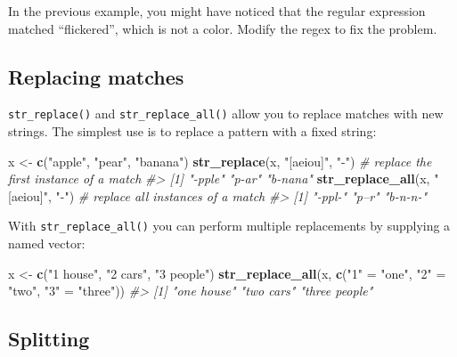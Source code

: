 \documentclass[]{book}
\newenvironment{Shaded}{\begin{snugshade}}{\end{snugshade}}
\newcommand{\CommentTok}[1]{\textcolor[rgb]{0.56,0.35,0.01}{\textit{#1}}}
\newcommand{\KeywordTok}[1]{\textcolor[rgb]{0.13,0.29,0.53}{\textbf{#1}}}
\newcommand{\NormalTok}[1]{#1}
\newcommand{\StringTok}[1]{\textcolor[rgb]{0.31,0.60,0.02}{#1}}
\begin{document}
In the previous example, you might have noticed that the regular expression matched ``flickered'', which is not a color. Modify the regex to fix the problem.

\hypertarget{replacing-matches}{%
\subsection{Replacing matches}\label{replacing-matches}}

\texttt{str\_replace()} and \texttt{str\_replace\_all()} allow you to replace matches with new strings. The simplest use is to replace a pattern with a fixed string:

\begin{Shaded}
\begin{Highlighting}[]
\NormalTok{x <-}\StringTok{ }\KeywordTok{c}\NormalTok{(}\StringTok{"apple"}\NormalTok{, }\StringTok{"pear"}\NormalTok{, }\StringTok{"banana"}\NormalTok{)}
\KeywordTok{str_replace}\NormalTok{(x, }\StringTok{"[aeiou]"}\NormalTok{, }\StringTok{"-"}\NormalTok{) }\CommentTok{# replace the first instance of a match}
\CommentTok{#> [1] "-pple"  "p-ar"   "b-nana"}
\KeywordTok{str_replace_all}\NormalTok{(x, }\StringTok{"[aeiou]"}\NormalTok{, }\StringTok{"-"}\NormalTok{) }\CommentTok{# replace all instances of a match}
\CommentTok{#> [1] "-ppl-"  "p--r"   "b-n-n-"}
\end{Highlighting}
\end{Shaded}

With \texttt{str\_replace\_all()} you can perform multiple replacements by supplying a named vector:

\begin{Shaded}
\begin{Highlighting}[]
\NormalTok{x <-}\StringTok{ }\KeywordTok{c}\NormalTok{(}\StringTok{"1 house"}\NormalTok{, }\StringTok{"2 cars"}\NormalTok{, }\StringTok{"3 people"}\NormalTok{)}
\KeywordTok{str_replace_all}\NormalTok{(x, }\KeywordTok{c}\NormalTok{(}\StringTok{"1"}\NormalTok{ =}\StringTok{ "one"}\NormalTok{, }\StringTok{"2"}\NormalTok{ =}\StringTok{ "two"}\NormalTok{, }\StringTok{"3"}\NormalTok{ =}\StringTok{ "three"}\NormalTok{))}
\CommentTok{#> [1] "one house"    "two cars"     "three people"}
\end{Highlighting}
\end{Shaded}

\hypertarget{splitting}{%
\subsection{Splitting}\label{splitting}}
\end{document}
